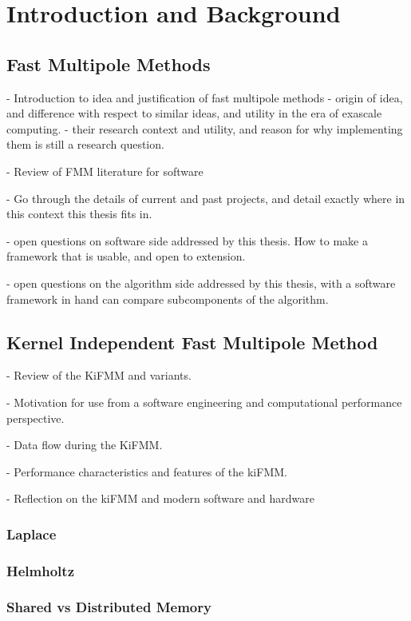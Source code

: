 \chapter{Introduction and Background}\label{chpt:introduction}
\thispagestyle{chaptertitle} %


\section{Fast Multipole Methods}

- Introduction to idea and justification of fast multipole methods
- origin of idea, and difference with respect to similar ideas, and utility in the era of exascale computing.
- their research context and utility, and reason for why implementing them is still a research question.

- Review of FMM literature for software

- Go through the details of current and past projects, and detail exactly where in this context this thesis fits in.

- open questions on software side addressed by this thesis. How to make a framework that is usable, and open to extension.

- open questions on the algorithm side addressed by this thesis, with a software framework in hand can compare subcomponents of the algorithm.

\section{Kernel Independent Fast Multipole Method}

- Review of the KiFMM and variants.

- Motivation for use from a software engineering and computational performance perspective.

- Data flow during the KiFMM.

- Performance characteristics and features of the kiFMM.

- Reflection on the kiFMM and modern software and hardware

\subsection{Laplace}

\subsection{Helmholtz}

\subsection{Shared vs Distributed Memory}